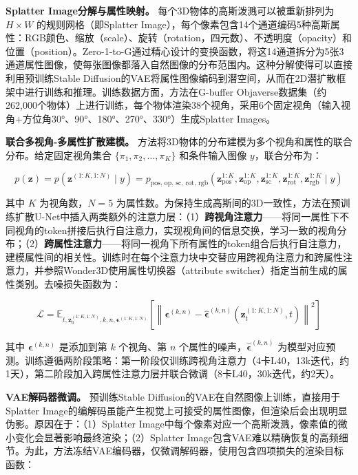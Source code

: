 \textbf{Splatter Image分解与属性映射。}
每个3D物体的高斯泼溅可以被重新排列为 $H \times W$ 的规则网格（即Splatter Image），每个像素包含14个通道编码5种高斯属性：RGB颜色、缩放（scale）、旋转（rotation，四元数）、不透明度（opacity）和位置（position）。Zero-1-to-G通过精心设计的变换函数，将这14通道拆分为5张3通道属性图像，使每张图像都落入自然图像的分布范围内。这种分解使得可以直接利用预训练Stable Diffusion的VAE将属性图像编码到潜空间，从而在2D潜扩散框架中进行训练和推理。训练数据方面，方法在G-buffer Objaverse数据集（约262,000个物体）上进行训练，每个物体渲染38个视角，采用6个固定视角（输入视角+方位角30°、90°、180°、270°、330°）生成Splatter Images。

\textbf{联合多视角-多属性扩散建模。}
方法将3D物体的分布建模为多个视角和属性的联合分布。给定固定视角集合 $\{\pi_1, \pi_2, \ldots, \pi_K\}$ 和条件输入图像 $y$，联合分布为：

\begin{equation}
p(\mathbf{z}) = p\left(\mathbf{z}^{(1:K, 1:N)} \mid y\right) = p_{\text{pos, op, sc, rot, rgb}}\left(\mathbf{z}_{\text{pos}}^{1:K}, \mathbf{z}_{\text{op}}^{1:K}, \mathbf{z}_{\text{sc}}^{1:K}, \mathbf{z}_{\text{rot}}^{1:K}, \mathbf{z}_{\text{rgb}}^{1:K} \mid y\right)
\end{equation}

其中 $K$ 为视角数，$N=5$ 为属性数。为保持生成高斯间的3D一致性，方法在预训练扩散U-Net中插入两类额外的注意力层：（1）\textbf{跨视角注意力}——将同一属性下不同视角的token拼接后执行自注意力，实现视角间的信息交换，学习一致的视角分布；（2）\textbf{跨属性注意力}——将同一视角下所有属性的token组合后执行自注意力，建模属性间的相关性。训练时在每个注意力块中交替应用跨视角注意力和跨属性注意力，并参照Wonder3D使用属性切换器（attribute switcher）指定当前生成的属性类别。去噪损失函数为：

\begin{equation}
\mathcal{L} = \mathbb{E}_{t, \mathbf{z}_0^{(1:K, 1:N)}, k, n, \boldsymbol{\epsilon}^{(1:K, 1:N)}}\left[\left\|\boldsymbol{\epsilon}^{(k,n)} - \hat{\boldsymbol{\epsilon}}^{(k,n)}\left(\mathbf{z}_t^{(1:K, 1:N)}, t\right)\right\|^2\right]
\end{equation}

其中 $\boldsymbol{\epsilon}^{(k,n)}$ 是添加到第 $k$ 个视角、第 $n$ 个属性的噪声，$\hat{\boldsymbol{\epsilon}}^{(k,n)}$ 为模型对应预测。训练遵循两阶段策略：第一阶段仅训练跨视角注意力（4卡L40，13k迭代，约1天），第二阶段加入跨属性注意力层并联合微调（8卡L40，30k迭代，约2天）。

\textbf{VAE解码器微调。}
预训练Stable Diffusion的VAE在自然图像上训练，直接用于Splatter Image的编解码虽能产生视觉上可接受的属性图像，但渲染后会出现明显伪影。原因在于：（1）Splatter Image中每个像素对应一个高斯泼溅，像素值的微小变化会显著影响最终渲染；（2）Splatter Image包含VAE难以精确恢复的高频细节。为此，方法冻结VAE编码器，仅微调解码器，使用包含四项损失的渲染目标函数：

